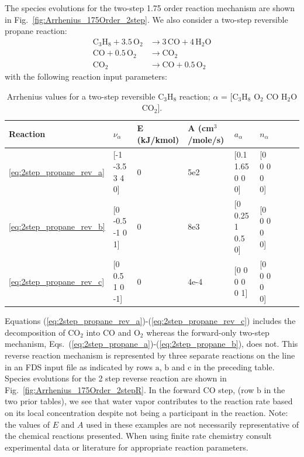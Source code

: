 \documentclass[11pt]{book}
\begin{document}
The species evolutions for the two-step 1.75 order reaction mechanism are shown in Fig.~\ref{fig:Arrhenius_175Order_2step}. We also consider a two-step reversible propane reaction:
\begin{subequations}
\begin{align}
\label{eq:2step_propane_rev_a}
\mathrm{C_3H_8+3.5 \, O_2} &\rightarrow \mathrm{3 \, CO+4 \, H_2O} \\
\label{eq:2step_propane_rev_b}
\mathrm{CO + 0.5 \, O_2} &\rightarrow \mathrm{CO_2} \\
\label{eq:2step_propane_rev_c}
\mathrm{CO_2} &\rightarrow \mathrm{CO + 0.5 \, O_2}
\end{align}
\end{subequations}
with the following reaction input parameters:
\begin{table}[ht]
\begin{center}
\caption[Arrhenius values for a two-step reversible C$_3$H$_8$ reaction]{Arrhenius values for a two-step reversible C$_3$H$_8$ reaction; $\alpha$ = [$\mathrm{C_3H_8}$ $\mathrm{O_2}$ $\mathrm{CO}$ $\mathrm{H_2O}$ $\mathrm{CO_2}$].}
\label{two_step_rev_c3h8}
\begin{tabular}{|l|l|l|l|l|l|l|l|l|}
\hline Reaction & $\nu_{\alpha}$ & E (kJ/kmol) & A (cm$^3$/mole/s) & $a_{\alpha}$ & $n_{\alpha}$  \\ \hline \hline
\ref{eq:2step_propane_rev_a} & [-1 -3.5 3 4 0] & 0 & 5e2  & [0.1 1.65 0 0 0] & [0 0 0 0 0] \\ \hline
\ref{eq:2step_propane_rev_b} & [0 -0.5 -1 0 1] & 0 & 8e3  & [0 0.25 1 0.5 0] & [0 0 0 0 0] \\ \hline
\ref{eq:2step_propane_rev_c} & [0 0.5 1 0 -1]  & 0 & 4e-4 & [0 0 0 0 0 1]    & [0 0 0 0 0] \\ \hline
\end{tabular}
\end{center}
\end{table}
Equations (\ref{eq:2step_propane_rev_a})-(\ref{eq:2step_propane_rev_c}) includes the decomposition of $\mathrm{CO_2}$ into $\mathrm{CO}$ and $\mathrm{O_2}$ whereas the forward-only two-step mechanism, Eqs.~(\ref{eq:2step_propane_a})-(\ref{eq:2step_propane_b}), does not. This reverse reaction mechanism is represented by three separate reactions on the  line in an FDS input file as indicated by rows $\mathrm{a}$, $\mathrm{b}$ and $\mathrm{c}$ in the preceding table. Species evolutions for the 2 step reverse reaction are shown in Fig.~\ref{fig:Arrhenius_175Order_2stepR}. In the forward CO step, (row $\mathrm{b}$ in the two prior tables), we see that water vapor contributes to the reaction rate based on its local concentration despite not being a participant in the reaction.
\vskip8pt
Note: the values of $E$ and $A$ used in these examples are not necessarily representative of the chemical reactions presented. When using finite rate chemistry consult experimental data or literature for appropriate reaction parameters.
\end{document}
